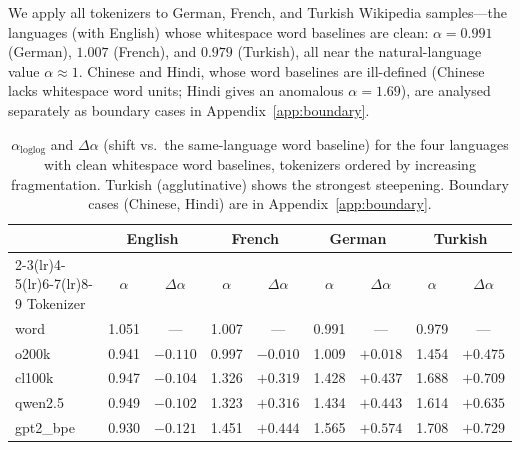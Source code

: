 \documentclass{article}
\begin{document}
We apply all tokenizers to German, French, and Turkish Wikipedia samples---the languages
(with English) whose whitespace word baselines are clean: $\alpha = 0.991$ (German),
$1.007$ (French), and $0.979$ (Turkish), all near the natural-language value
$\alpha \approx 1$. Chinese and Hindi, whose word baselines are ill-defined (Chinese
lacks whitespace word units; Hindi gives an anomalous $\alpha = 1.69$), are analysed
separately as boundary cases in Appendix~\ref{app:boundary}.


\begin{table}[t]
  \caption{$\alpha_{\text{loglog}}$ and $\Delta\alpha$ (shift vs.\ the same-language word
    baseline) for the four languages with clean whitespace word baselines, tokenizers
    ordered by increasing fragmentation. Turkish (agglutinative) shows the strongest
    steepening. Boundary cases (Chinese, Hindi) are in Appendix~\ref{app:boundary}.}
  \label{tab:crosslang}
  \centering
  \small
  \begin{tabular}{lcccccccc}
    \toprule
    & \multicolumn{2}{c}{English} & \multicolumn{2}{c}{French} & \multicolumn{2}{c}{German} & \multicolumn{2}{c}{Turkish} \\
    \cmidrule(lr){2-3}\cmidrule(lr){4-5}\cmidrule(lr){6-7}\cmidrule(lr){8-9}
    Tokenizer & $\alpha$ & $\Delta\alpha$ & $\alpha$ & $\Delta\alpha$ & $\alpha$ & $\Delta\alpha$ & $\alpha$ & $\Delta\alpha$ \\
    \midrule
    word      & 1.051 & ---      & 1.007 & ---      & 0.991 & ---      & 0.979 & ---      \\
    o200k     & 0.941 & $-0.110$ & 0.997 & $-0.010$ & 1.009 & $+0.018$ & 1.454 & $+0.475$ \\
    cl100k    & 0.947 & $-0.104$ & 1.326 & $+0.319$ & 1.428 & $+0.437$ & 1.688 & $+0.709$ \\
    qwen2.5   & 0.949 & $-0.102$ & 1.323 & $+0.316$ & 1.434 & $+0.443$ & 1.614 & $+0.635$ \\
    gpt2\_bpe & 0.930 & $-0.121$ & 1.451 & $+0.444$ & 1.565 & $+0.574$ & 1.708 & $+0.729$ \\
    \bottomrule
  \end{tabular}
\end{table}
\end{document}
